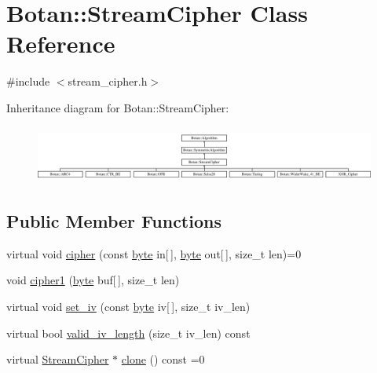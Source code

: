 \hypertarget{classBotan_1_1StreamCipher}{\section{Botan\-:\-:Stream\-Cipher Class Reference}
\label{classBotan_1_1StreamCipher}
}


{\ttfamily \#include $<$stream\-\_\-cipher.\-h$>$}

Inheritance diagram for Botan\-:\-:Stream\-Cipher\-:\begin{figure}[H]
\begin{center}
\leavevmode
\includegraphics[height=1.893491cm]{classBotan_1_1StreamCipher}
\end{center}
\end{figure}
\subsection*{Public Member Functions}
\begin{DoxyCompactItemize}
\item 
virtual void \hyperlink{classBotan_1_1StreamCipher_a447f265ece48d9af46f6947495ce3aeb}{cipher} (const \hyperlink{namespaceBotan_a7d793989d801281df48c6b19616b8b84}{byte} in\mbox{[}$\,$\mbox{]}, \hyperlink{namespaceBotan_a7d793989d801281df48c6b19616b8b84}{byte} out\mbox{[}$\,$\mbox{]}, size\-\_\-t len)=0
\item 
void \hyperlink{classBotan_1_1StreamCipher_a915a10a5959653711060aece2dcce075}{cipher1} (\hyperlink{namespaceBotan_a7d793989d801281df48c6b19616b8b84}{byte} buf\mbox{[}$\,$\mbox{]}, size\-\_\-t len)
\item 
virtual void \hyperlink{classBotan_1_1StreamCipher_a787dea4f477ea27e8ba0ed7e1da9120d}{set\-\_\-iv} (const \hyperlink{namespaceBotan_a7d793989d801281df48c6b19616b8b84}{byte} iv\mbox{[}$\,$\mbox{]}, size\-\_\-t iv\-\_\-len)
\item 
virtual bool \hyperlink{classBotan_1_1StreamCipher_aeb0aaa9c4248e22c8302b99b2dfa9e8d}{valid\-\_\-iv\-\_\-length} (size\-\_\-t iv\-\_\-len) const 
\item 
virtual \hyperlink{classBotan_1_1StreamCipher}{Stream\-Cipher} $\ast$ \hyperlink{classBotan_1_1StreamCipher_aa25d9ce72725e8bb0cf6c36540412397}{clone} () const =0
\end{DoxyCompactItemize}


